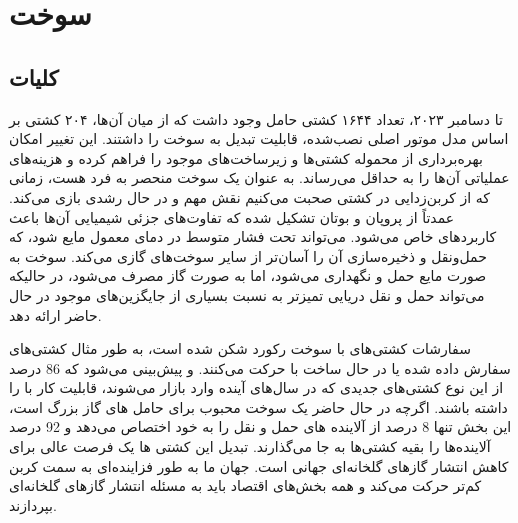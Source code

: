 \chapter{سوخت }
\section{کلیات}
تا دسامبر ۲۰۲۳، تعداد ۱۶۴۴ کشتی حامل
 وجود داشت که از میان آن‌ها، ۲۰۴ کشتی بر اساس مدل موتور اصلی نصب‌شده، قابلیت تبدیل به سوخت 
 را داشتند. این تغییر امکان بهره‌برداری از محموله کشتی‌ها و زیرساخت‌های موجود را فراهم کرده و هزینه‌های عملیاتی آن‌ها را به حداقل می‌رساند. 
به عنوان یک سوخت 
منحصر به فرد هست،‌ زمانی که از کربن‌‌زدایی در کشتی صحبت می‌کنیم نقش مهم و در حال رشدی 
بازی می‌کند.
عمدتاً از پروپان و بوتان تشکیل شده که تفاوت‌های جزئی شیمیایی آن‌ها باعث کاربردهای خاص می‌شود.
می‌تواند تحت فشار متوسط در دمای معمول مایع شود، که حمل‌ونقل و ذخیره‌سازی آن را آسان‌تر از سایر سوخت‌های گازی می‌کند.
سوخت 
به صورت مایع حمل و نگهداری می‌شود، اما به صورت گاز مصرف می‌شود، در حالیکه می‌تواند حمل و نقل دریایی تمیزتر به نسبت  بسیاری از جایگزین‌های موجود در حال حاضر ارائه دهد.

سفارشات کشتی‌های با سوخت 
 رکورد شکن شده است، به طور مثال کشتی‌های
  سفارش داده شده یا در حال ساخت با
   حرکت می‌کنند. و پیش‌بینی می‌شود که 86 درصد از این نوع کشتی‌های  
     جدیدی که در سال‌های آینده وارد بازار می‌شوند، قابلیت کار با 
    را داشته باشند. اگرچه 
    در حال حاضر یک سوخت محبوب برای حامل های گاز بزرگ است، این بخش تنها 8 درصد از آلاینده های حمل و نقل را به خود اختصاص می‌دهد و 92 درصد آلاینده‌ها را بقیه کشتی‌ها به جا می‌گذارند. تبدیل این کشتی ها یک فرصت عالی برای کاهش انتشار گازهای گلخانه‌ای جهانی است.
جهان ما به طور فزاینده‌ای به سمت کربن کم‌تر حرکت می‌کند و همه بخش‌های اقتصاد باید به مسئله انتشار گازهای گلخانه‌ای بپردازند.
\newpage

